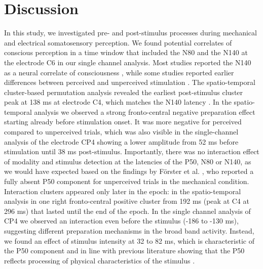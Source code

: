 \documentclass[11pt,a4paper,onecolumn]{article}
\begin{document}
\section*{Discussion}

In this study, we investigated pre- and post-stimulus processes during mechanical and electrical somatosensory perception.
We found potential correlates of conscious perception in a time window that included the N80 and the N140 at\\
 the electrode C6 in our single channel analysis. Most studies reported the N140 as a neural correlate of consciousness \cite{auksztulewiczRecurrentNeuralProcessing2012, schroderDissociatingPerceptualAwareness2021, forschackDissociableNeuralCorrelates2020}, while some studies reported earlier differences between perceived and unperceived stimulation \cite{palvaEarlyNeuralCorrelates2005, jonesNeuralCorrelatesTactile2007, forsterERPResponsesReveal2025}. The spatio-temporal cluster-based permutation analysis revealed the earliest post-stimulus cluster peak at 138 ms at electrode C4, which matches the N140 latency \cite{forschackDissociableNeuralCorrelates2020, schroderDistillingNeuralCorrelates2022}. 
In the spatio-temporal analysis we observed a strong fronto-central negative preparation effect starting already before stimulation onset. It was more negative for perceived compared to unperceived trials, which was also visible in the single-channel analysis of the electrode CP4 showing a lower amplitude from 52 ms before stimulation until 38 ms post-stimulus. 
Importantly, there was no interaction effect of modality and stimulus detection at the latencies of the P50, N80 or N140, as we would have expected based on the findings by Förster et al. \cite{forsterERPResponsesReveal2025}, who reported a fully absent P50 component for unperceived trials in the mechanical condition. Interaction clusters appeared only later in the epoch: in the spatio-temporal analysis in one right fronto-central positive cluster from 192 ms (peak at C4 at 296 ms) that lasted until the end of the epoch. In the single channel analysis of CP4 we observed an interaction even before the stimulus (-186 to -130 ms), suggesting different preparation mechanisms in the broad band activity.
Instead, we found an effect of stimulus intensity at 32 to 82 ms, which is characteristic of the P50 component and in line with previous literature showing that the P50 reflects processing of physical characteristics of the stimulus \cite{forschackDissociableNeuralCorrelates2020, schroderDissociatingPerceptualAwareness2021}. 
\end{document}
